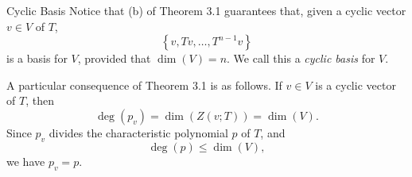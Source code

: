 \documentclass[math_245.tex]{subfiles}
\begin{document}
    \begin{definition}{Cyclic Basis}{}
        Notice that (b) of Theorem 3.1 guarantees that, given a cyclic vector $v\in V$ of $T$,
        \begin{equation*}
            \left\lbrace v, Tv, \ldots, T^{n-1}v \right\rbrace 
        \end{equation*}
        is a basis for $V$, provided that $\dim(V)=n$. We call this a \emph{cyclic basis} for $V$.
    \end{definition}

    \begin{remark}
        A particular consequence of Theorem 3.1 is as follows. If $v\in V$ is a cyclic vector of $T$, then
        \begin{equation*}
            \deg(p_v) = \dim \left( Z(v;T) \right) = \dim(V).
        \end{equation*}
        Since $p_v$ divides the characteristic polynomial $p$ of $T$, and
        \begin{equation*}
            \deg(p)\leq\dim(V),
        \end{equation*}
        we have $p_v=p$.
    \end{remark}
\end{document}
